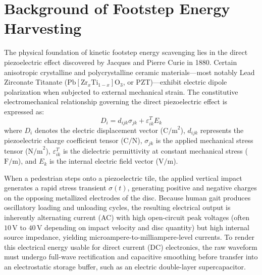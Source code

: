 \section{Background of Footstep Energy Harvesting}
The physical foundation of kinetic footstep energy scavenging lies in the direct piezoelectric effect discovered by Jacques and Pierre Curie in 1880. Certain anisotropic crystalline and polycrystalline ceramic materials---most notably Lead Zirconate Titanate ($\text{Pb}[\text{Zr}_x\text{Ti}_{1-x}]\text{O}_3$, or PZT)---exhibit electric dipole polarization when subjected to external mechanical strain. The constitutive electromechanical relationship governing the direct piezoelectric effect is expressed as:
\begin{equation}
D_i = d_{ijk} \sigma_{jk} + \varepsilon_{ik}^T E_k
\label{eq:piezo_constitutive}
\end{equation}
where $D_i$ denotes the electric displacement vector ($\text{C/m}^2$), $d_{ijk}$ represents the piezoelectric charge coefficient tensor ($\text{C/N}$), $\sigma_{jk}$ is the applied mechanical stress tensor ($\text{N/m}^2$), $\varepsilon_{ik}^T$ is the dielectric permittivity at constant mechanical stress ($\text{F/m}$), and $E_k$ is the internal electric field vector ($\text{V/m}$).

When a pedestrian steps onto a piezoelectric tile, the applied vertical impact generates a rapid stress transient $\sigma(t)$, generating positive and negative charges on the opposing metallized electrodes of the disc. Because human gait produces oscillatory loading and unloading cycles, the resulting electrical output is inherently alternating current (AC) with high open-circuit peak voltages (often $10\,\text{V}$ to $40\,\text{V}$ depending on impact velocity and disc quantity) but high internal source impedance, yielding microampere-to-milliampere-level currents. To render this electrical energy usable for direct current (DC) electronics, the raw waveform must undergo full-wave rectification and capacitive smoothing before transfer into an electrostatic storage buffer, such as an electric double-layer supercapacitor.

